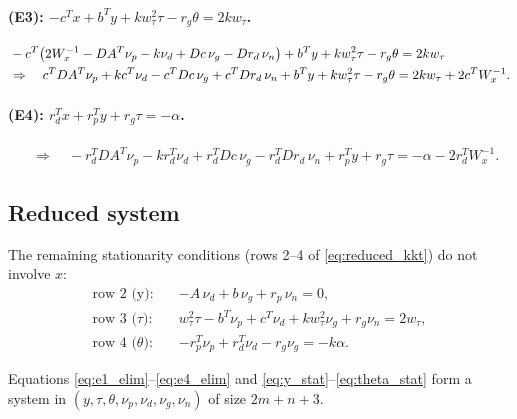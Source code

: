 \documentclass{article}
\begin{document}
\paragraph{(E3): $-c^Tx + b^Ty + kw_\tau^2\tau - r_g\theta = 2kw_\tau$.}
\begin{align}
  &-c^T\bigl(2W_x^{-1} - DA^T\nu_p - k\nu_d + Dc\,\nu_g - Dr_d\,\nu_n\bigr) + b^Ty + kw_\tau^2\tau - r_g\theta = 2kw_\tau \notag\\
  &\Rightarrow\quad c^TDA^T\nu_p + kc^T\nu_d - c^TDc\,\nu_g + c^TDr_d\,\nu_n + b^Ty + kw_\tau^2\tau - r_g\theta = 2kw_\tau + 2c^TW_x^{-1}. \label{eq:e3_elim}
\end{align}

\paragraph{(E4): $r_d^Tx + r_p^Ty + r_g\tau = -\alpha$.}
\begin{align}
  &\Rightarrow\quad -r_d^TDA^T\nu_p - kr_d^T\nu_d + r_d^TDc\,\nu_g - r_d^TDr_d\,\nu_n + r_p^Ty + r_g\tau = -\alpha - 2r_d^TW_x^{-1}. \label{eq:e4_elim}
\end{align}

\subsection{Reduced system}

The remaining stationarity conditions (rows 2--4 of \eqref{eq:reduced_kkt}) do not involve $x$:
\begin{align}
  \text{row 2 (y):} \quad & -A\,\nu_d + b\,\nu_g + r_p\,\nu_n = 0, \label{eq:y_stat}\\
  \text{row 3 ($\tau$):} \quad & w_\tau^2\tau - b^T\nu_p + c^T\nu_d + kw_\tau^2\nu_g + r_g\nu_n = 2w_\tau, \label{eq:tau_stat}\\
  \text{row 4 ($\theta$):} \quad & -r_p^T\nu_p + r_d^T\nu_d - r_g\nu_g = -k\alpha. \label{eq:theta_stat}
\end{align}

Equations \eqref{eq:e1_elim}--\eqref{eq:e4_elim} and \eqref{eq:y_stat}--\eqref{eq:theta_stat} form a system in $(y, \tau, \theta, \nu_p, \nu_d, \nu_g, \nu_n)$ of size $2m + n + 3$.
\end{document}
